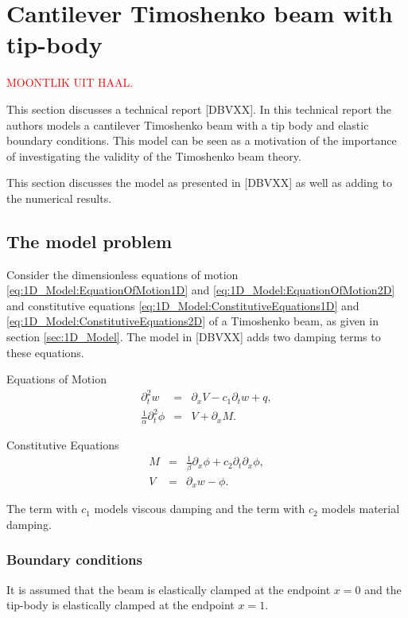 \documentclass[../../main.tex]{subfiles}
\begin{document}
\noindent
\section{Cantilever Timoshenko beam with tip-body}

\textcolor{red}{MOONTLIK UIT HAAL.}

This section discusses a technical report [DBVXX]. In this technical report the authors models a cantilever Timoshenko beam with a tip body and elastic boundary conditions. This model can be seen as a motivation of the importance of investigating the validity of the Timoshenko beam theory.

This section discusses the model as presented in [DBVXX] as well as adding to the numerical results.

\subsection{The model problem}
Consider the dimensionless equations of motion \ref{eq:1D_Model:EquationOfMotion1D} and \ref{eq:1D_Model:EquationOfMotion2D} and constitutive equations \ref{eq:1D_Model:ConstitutiveEquations1D} and \ref{eq:1D_Model:ConstitutiveEquations2D} of a Timoshenko beam, as given in section \ref{sec:1D_Model}. The model in [DBVXX] adds two damping terms to these equations.


{Equations of Motion}
\begin{eqnarray}
	\partial_t^2 w &=& \partial_x V - c_1\partial_t w  + q, \label{CT_1}\\
	\frac{1}{\alpha}\partial_t^2 \phi &=& V+\partial_xM. \label{CT_2}
\end{eqnarray}

\noindent
{Constitutive Equations}
\begin{eqnarray}
	M &=& \frac{1}{\beta}\partial_x \phi +c_2 \partial_t \partial_x \phi,\label{CT_3}\\
	V&=& \partial_x w - \phi.\label{CT_4}
\end{eqnarray}

The term with $c_1$ models viscous damping and the term with $c_2$ models material damping.

\subsubsection{Boundary conditions}
It is assumed that the beam is elastically clamped at the endpoint $x=0$ and the tip-body is elastically clamped at the endpoint $x=1$.\\
\end{document}
